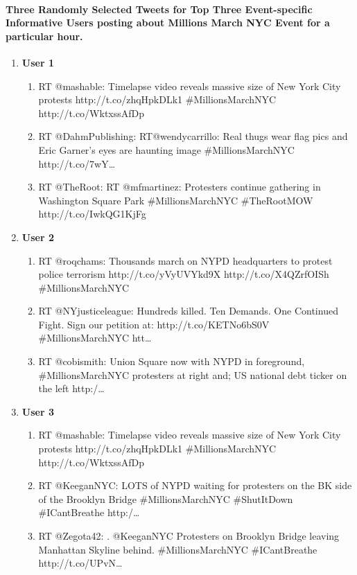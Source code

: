 \paragraph{Three Randomly Selected Tweets for Top Three Event-specific Informative Users posting about Millions March NYC Event for a particular hour.}
\begin{enumerate}
\item \textbf{User 1}
\begin{enumerate}
\item RT @mashable: Timelapse video reveals massive size of New York City protests http://t.co/zhqHpkDLk1 \#MillionsMarchNYC http://t.co/WktxssAfDp
\item RT @DahmPublishing: RT@wendycarrillo: Real thugs wear flag pics and Eric Garner's eyes are haunting image \#MillionsMarchNYC http://t.co/7wY…
\item RT @TheRoot: RT @mfmartinez: Protesters continue gathering in Washington Square Park \#MillionsMarchNYC \#TheRootMOW http://t.co/IwkQG1KjFg
\end{enumerate}

\item \textbf{User 2}
\begin{enumerate}
\item RT @roqchams: Thousands march on NYPD headquarters to protest police terrorism http://t.co/yVyUVYkd9X http://t.co/X4QZrfOISh \#MillionsMarchNYC
\item RT @NYjusticeleague: Hundreds killed. Ten Demands. One Continued Fight.  Sign our petition at: http://t.co/KETNo6bS0V \#MillionsMarchNYC htt…
\item RT @cobismith: Union Square now with NYPD in foreground, \#MillionsMarchNYC protesters at right and; US national debt ticker on the left http:/…
\end{enumerate}

\item \textbf{User 3}
\begin{enumerate}
\item RT @mashable: Timelapse video reveals massive size of New York City protests http://t.co/zhqHpkDLk1 \#MillionsMarchNYC http://t.co/WktxssAfDp
\item RT @KeeganNYC: LOTS of NYPD waiting for protesters on the BK side of the Brooklyn Bridge \#MillionsMarchNYC \#ShutItDown \#ICantBreathe http:/…
\item RT @Zegota42: . @KeeganNYC Protesters on Brooklyn Bridge leaving Manhattan Skyline behind. \#MillionsMarchNYC \#ICantBreathe http://t.co/UPvN…
\end{enumerate}

\end{enumerate}

